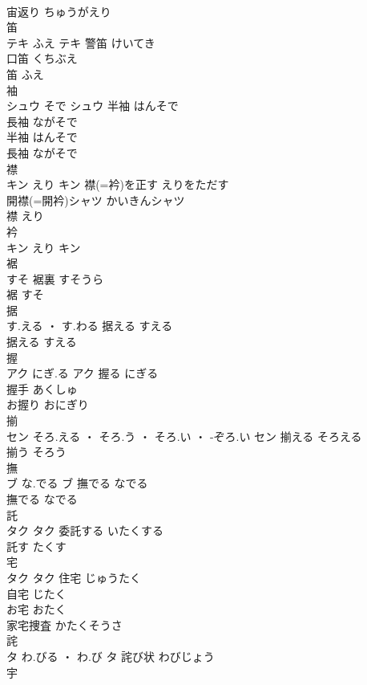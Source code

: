 \documentclass[8pt]{extreport}
\begin{document}
\begin{CJK}{UTF8}{min}
\\	宙返り	ちゅうがえり	
\\	笛	
\\	テキ	ふえ	テキ	警笛	けいてき	
\\	口笛	くちぶえ	
\\	笛	ふえ	
\\	袖	
\\	シュウ	そで	シュウ	半袖	はんそで	
\\	長袖	ながそで	
\\	半袖	はんそで	
\\	長袖	ながそで	
\\	襟	
\\	キン	えり	キン	襟(=衿)を正す	えりをただす	
\\	開襟(=開衿)シャツ	かいきんシャツ	
\\	襟	えり	
\\	衿	
\\	キン	えり	キン																																			
\\	裾	
\\	すそ		裾裏	すそうら	
\\	裾	すそ	
\\	据	
\\	す.える ・ す.わる		据える	すえる	
\\	据える	すえる	
\\	握	
\\	アク	にぎ.る	アク	握る	にぎる	
\\	握手	あくしゅ	
\\	お握り	おにぎり	
\\	揃	
\\	セン	そろ.える ・ そろ.う ・ そろ.い ・ -ぞろ.い	セン	揃える	そろえる	
\\	揃う	そろう	
\\	撫	
\\	ブ	な.でる	ブ	撫でる	なでる	
\\	撫でる	なでる	
\\	託	
\\	タク		タク	委託する	いたくする	
\\	託す	たくす	
\\	宅	
\\	タク		タク	住宅	じゅうたく	
\\	自宅	じたく	
\\	お宅	おたく	
\\	家宅捜査	かたくそうさ	
\\	詫	
\\	タ	わ.びる ・ わ.び	タ													詫び状	わびじょう	
\\	宇	

\end{CJK}
\end{document}
